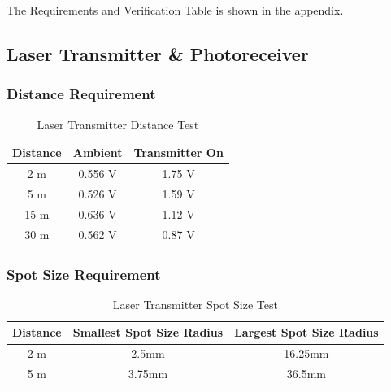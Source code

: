 \documentclass[letterpaper,10pt]{article}
\begin{document}
\begin{spacing}{1.15}
The Requirements and Verification Table is shown in the appendix.


\subsection{Laser Transmitter \& Photoreceiver}
\subsubsection{Distance Requirement}
\begin{table}[htbp]
	\centering
	\begin{tabular}{c|c|c}	%
		\toprule	%
		Distance & Ambient & Transmitter On \\
		\midrule
		2 m  & 0.556 V & 1.75 V\\
		5 m & 0.526 V & 1.59 V\\
		15 m & 0.636 V & 1.12 V\\ 
		30 m & 0.562 V & 0.87 V\\
		
		\bottomrule	%
	\end{tabular}%
	\caption{Laser Transmitter Distance Test}
	\label{tab:distance-requirement}	%
\end{table}%

\subsubsection{Spot Size Requirement}
\begin{table}[htbp]
	\centering
	\begin{tabular}{c|c|c}	%
		\toprule	%
		Distance & Smallest Spot Size Radius & Largest Spot Size Radius \\
		\midrule
		2 m  & 2.5mm & 16.25mm\\
		5 m & 3.75mm & 36.5mm\\

		
		\bottomrule	%
	\end{tabular}%
	\caption{Laser Transmitter Spot Size Test}
	\label{tab:distance-requirement}	%
\end{table}%


\end{spacing}
\end{document}
